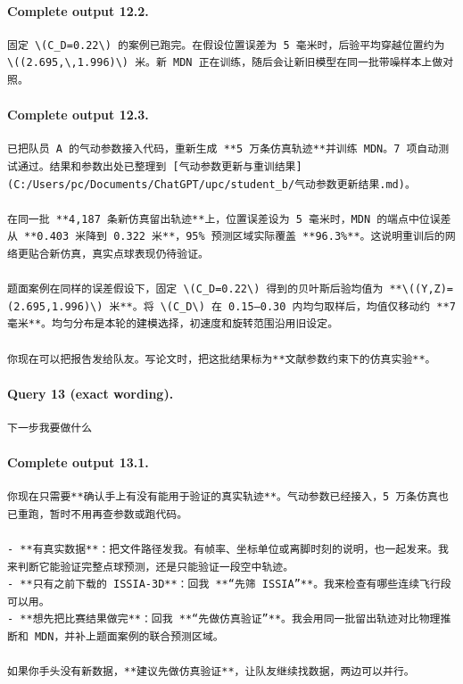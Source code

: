 \documentclass[UTF8,10pt]{ctexart}
\begin{document}
\paragraph{Complete output 12.2.}
\begin{Verbatim}[breaklines=true,breakanywhere=true,fontsize=\scriptsize,frame=single,framesep=2pt]
固定 \(C_D=0.22\) 的案例已跑完。在假设位置误差为 5 毫米时，后验平均穿越位置约为 \((2.695,\,1.996)\) 米。新 MDN 正在训练，随后会让新旧模型在同一批带噪样本上做对照。
\end{Verbatim}

\paragraph{Complete output 12.3.}
\begin{Verbatim}[breaklines=true,breakanywhere=true,fontsize=\scriptsize,frame=single,framesep=2pt]
已把队员 A 的气动参数接入代码，重新生成 **5 万条仿真轨迹**并训练 MDN。7 项自动测试通过。结果和参数出处已整理到 [气动参数更新与重训结果](C:/Users/pc/Documents/ChatGPT/upc/student_b/气动参数更新结果.md)。

在同一批 **4,187 条新仿真留出轨迹**上，位置误差设为 5 毫米时，MDN 的端点中位误差从 **0.403 米降到 0.322 米**，95% 预测区域实际覆盖 **96.3%**。这说明重训后的网络更贴合新仿真，真实点球表现仍待验证。

题面案例在同样的误差假设下，固定 \(C_D=0.22\) 得到的贝叶斯后验均值为 **\((Y,Z)=(2.695,1.996)\) 米**。将 \(C_D\) 在 0.15–0.30 内均匀取样后，均值仅移动约 **7 毫米**。均匀分布是本轮的建模选择，初速度和旋转范围沿用旧设定。

你现在可以把报告发给队友。写论文时，把这批结果标为**文献参数约束下的仿真实验**。
\end{Verbatim}

\paragraph{Query 13 (exact wording).}
\begin{Verbatim}[breaklines=true,breakanywhere=true,fontsize=\scriptsize,frame=single,framesep=2pt]
下一步我要做什么
\end{Verbatim}

\paragraph{Complete output 13.1.}
\begin{Verbatim}[breaklines=true,breakanywhere=true,fontsize=\scriptsize,frame=single,framesep=2pt]
你现在只需要**确认手上有没有能用于验证的真实轨迹**。气动参数已经接入，5 万条仿真也已重跑，暂时不用再查参数或跑代码。

- **有真实数据**：把文件路径发我。有帧率、坐标单位或离脚时刻的说明，也一起发来。我来判断它能验证完整点球预测，还是只能验证一段空中轨迹。
- **只有之前下载的 ISSIA-3D**：回我 **“先筛 ISSIA”**。我来检查有哪些连续飞行段可以用。
- **想先把比赛结果做完**：回我 **“先做仿真验证”**。我会用同一批留出轨迹对比物理推断和 MDN，并补上题面案例的联合预测区域。

如果你手头没有新数据，**建议先做仿真验证**，让队友继续找数据，两边可以并行。
\end{Verbatim}
\end{document}
